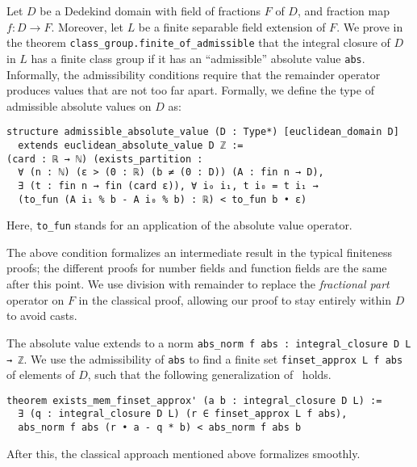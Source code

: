 \documentclass[a4paper,USenglish,cleveref, autoref, thm-restate]{lipics-v2021}
\newcommand{\lean}[1]{\texttt{#1}\xspace} %
\begin{document}
Let $D$ be a Dedekind domain with field of fractions $F$ of $D$, and fraction map $f \colon D \to F$.
Moreover, let $L$ be a finite separable field extension of $F$. We prove in the theorem \lean{class\_group.finite\_of\_admissible} that the integral closure of $D$ in $L$ has a finite class group if it has an ``admissible'' absolute value \lean{abs}.
Informally, the admissibility conditions require that the remainder operator produces values that are not too far apart.
Formally, we define the type of admissible absolute values on $D$ as:
\begin{lstlisting}
structure admissible_absolute_value (D : Type*) [euclidean_domain D]
  extends euclidean_absolute_value D ℤ :=
(card : ℝ → ℕ) (exists_partition :
  ∀ (n : ℕ) (ε > (0 : ℝ) (b ≠ (0 : D)) (A : fin n → D),
  ∃ (t : fin n → fin (card ε)), ∀ i₀ i₁, t i₀ = t i₁ →
  (to_fun (A i₁ % b - A i₀ % b) : ℝ) < to_fun b • ε)
\end{lstlisting}
Here, \lean{to\_fun} stands for an application of the absolute value operator.

The above condition formalizes an intermediate result in the typical finiteness proofs;
the different proofs for number fields and function fields are the same after this point.
We use division with remainder to replace the \emph{fractional part} operator on $F$ in the classical proof,
allowing our proof to stay entirely within $D$ to avoid casts.

The absolute value extends to a norm \lean{abs\_norm f abs : integral\_closure D L → ℤ}.
We use the admissibility of \lean{abs} to find a finite set \lean{finset\_approx L f abs} of elements of $D$,
such that the following generalization of~\cite[Theorem~12.2.1]{Ireland-Rosen} holds.
\begin{lstlisting}
theorem exists_mem_finset_approx' (a b : integral_closure D L) :=
  ∃ (q : integral_closure D L) (r ∈ finset_approx L f abs),
  abs_norm f abs (r • a - q * b) < abs_norm f abs b
\end{lstlisting}
After this, the classical approach mentioned above formalizes smoothly.
\end{document}
